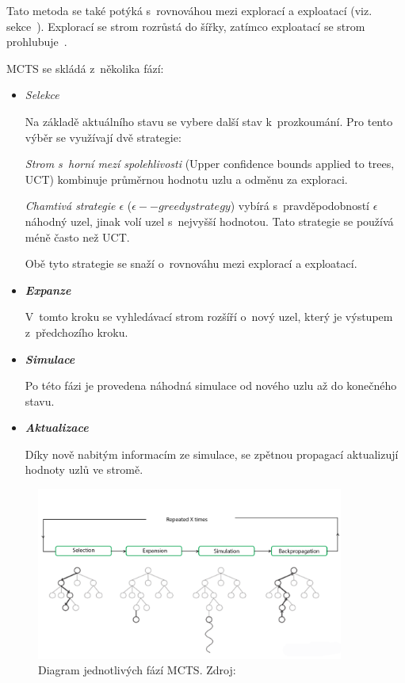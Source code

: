 Tato metoda se také potýká s~rovnováhou mezi explorací a exploatací (viz.~ sekce~).
Explorací se strom rozrůstá do šířky, zatímco exploatací se strom prohlubuje~\cite{mcts_geeksforgeeks}.

MCTS se skládá z~několika fází:
\begin{itemize}
  \item \emph{Selekce}

  Na základě aktuálního stavu se vybere další stav k~prozkoumání.
  Pro tento výběr se využívají dvě strategie:
  
  \emph{Strom s~horní mezí spolehlivosti} (Upper confidence bounds applied to trees, UCT) kombinuje průměrnou hodnotu uzlu a odměnu za exploraci.

  \label{epsilon_greedy}
  \emph{Chamtivá strategie $\epsilon$ } ($\epsilon--greedy strategy$) vybírá s~pravděpodobností $\epsilon$ náhodný uzel, jinak volí uzel s~nejvyšší hodnotou.
  Tato strategie se používá méně často než UCT\@.

  Obě tyto strategie se snaží o~rovnováhu mezi explorací a exploatací.
  \item \textbf{\emph{Expanze}}

  V~tomto kroku se vyhledávací strom rozšíří o~nový uzel, který je výstupem z~předchozího kroku.

  \item \textbf{\emph{Simulace}}

  Po této fázi je provedena náhodná simulace od nového uzlu až do konečného stavu.

  \item \textbf{\emph{Aktualizace}}
  
  Díky nově nabitým informacím ze simulace, se zpětnou propagací aktualizují hodnoty uzlů ve stromě.

\end{itemize}

\begin{figure}[H]
	\centering
	\includegraphics[width=0.9\textwidth]{obrazky-figures/mcts}
	\caption{Diagram jednotlivých fází MCTS.\@
  Zdroj: \cite{mcts_geeksforgeeks}}\label{fig:mcts}
\end{figure}

